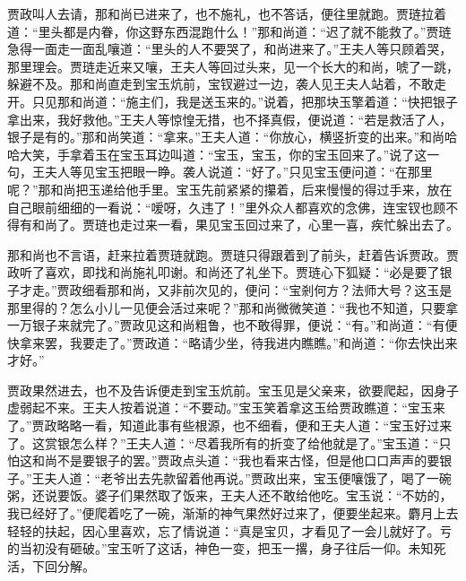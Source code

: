 \begin{parag}
    贾政叫人去请，那和尚已进来了，也不施礼，也不答话，便往里就跑。贾琏拉着道：“里头都是内眷，你这野东西混跑什么！”那和尚道：“迟了就不能救了。”贾琏急得一面走一面乱嚷道：“里头的人不要哭了，和尚进来了。”王夫人等只顾着哭，那里理会。贾琏走近来又嚷，王夫人等回过头来，见一个长大的和尚，唬了一跳，躲避不及。那和尚直走到宝玉炕前，宝钗避过一边，袭人见王夫人站着，不敢走开。只见那和尚道：“施主们，我是送玉来的。”说着，把那块玉擎着道：“快把银子拿出来，我好救他。”王夫人等惊惶无措，也不择真假，便说道：“若是救活了人，银子是有的。”那和尚笑道：“拿来。”王夫人道：“你放心，横竖折变的出来。”和尚哈哈大笑，手拿着玉在宝玉耳边叫道：“宝玉，宝玉，你的宝玉回来了。”说了这一句，王夫人等见宝玉把眼一睁。袭人说道：“好了。”只见宝玉便问道：“在那里呢？”那和尚把玉递给他手里。宝玉先前紧紧的攥着，后来慢慢的得过手来，放在自己眼前细细的一看说：“嗳呀，久违了！”里外众人都喜欢的念佛，连宝钗也顾不得有和尚了。贾琏也走过来一看，果见宝玉回过来了，心里一喜，疾忙躲出去了。
\end{parag}


\begin{parag}
    那和尚也不言语，赶来拉着贾琏就跑。贾琏只得跟着到了前头，赶着告诉贾政。贾政听了喜欢，即找和尚施礼叩谢。和尚还了礼坐下。贾琏心下狐疑：“必是要了银子才走。”贾政细看那和尚，又非前次见的，便问：“宝剎何方？法师大号？这玉是那里得的？怎么小儿一见便会活过来呢？”那和尚微微笑道：“我也不知道，只要拿一万银子来就完了。”贾政见这和尚粗鲁，也不敢得罪，便说：“有。”和尚道：“有便快拿来罢，我要走了。”贾政道：“略请少坐，待我进内瞧瞧。”和尚道：“你去快出来才好。”
\end{parag}


\begin{parag}
    贾政果然进去，也不及告诉便走到宝玉炕前。宝玉见是父亲来，欲要爬起，因身子虚弱起不来。王夫人按着说道：“不要动。”宝玉笑着拿这玉给贾政瞧道：“宝玉来了。”贾政略略一看，知道此事有些根源，也不细看，便和王夫人道：“宝玉好过来了。这赏银怎么样？”王夫人道：“尽着我所有的折变了给他就是了。”宝玉道：“只怕这和尚不是要银子的罢。”贾政点头道：“我也看来古怪，但是他口口声声的要银子。”王夫人道：“老爷出去先款留着他再说。”贾政出来，宝玉便嚷饿了，喝了一碗粥，还说要饭。婆子们果然取了饭来，王夫人还不敢给他吃。宝玉说：“不妨的，我已经好了。”便爬着吃了一碗，渐渐的神气果然好过来了，便要坐起来。麝月上去轻轻的扶起，因心里喜欢，忘了情说道：“真是宝贝，才看见了一会儿就好了。亏的当初没有砸破。”宝玉听了这话，神色一变，把玉一撂，身子往后一仰。未知死活，下回分解。
\end{parag}
